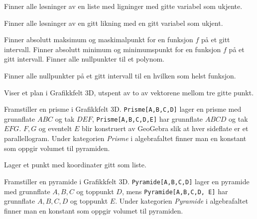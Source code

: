 

{Finner alle løsninger av en liste med ligninger med gitte variabel som ukjente.}

{Finner alle løsninger av en gitt likning med en gitt variabel som ukjent.}

 {Finner absolutt maksimum og maskimalpunkt for en funksjon $ f $ på et gitt intervall.}
\newpage
{} {Finner absolutt minimum og minimumspunkt for en funksjon $ f $ på et gitt intervall.}
\newpage
{}
{Finner alle nullpunkter til et polynom.}

{Finner alle nullpunkter på et gitt intervall til en hvilken som helst funksjon.}

{Viser et plan i Grafikkfelt 3D, utspent av to av vektorene mellom tre gitte punkt.}

{Framstiller en prisme i Grafikkfelt 3D. {\tt Prisme[A,B,C,D]} lager en prisme med grunnflate $ ABC $ og tak $ DEF $, {\tt Prisme[A,B,C,D,E]} har grunnflate $ ABCD $ og tak $ EFG $. $ F, G$ og eventelt $ E $ blir konstruert av GeoGebra slik at hver sideflate er et parallellogram. Under kategorien \textsl{Prisme} i algebrafaltet finner man en konstant som oppgir volumet til pyramiden.}

 {Lager et punkt med koordinater gitt som liste. \\
	
}

{Framstiller en pyramide i Grafikkfelt 3D. {\tt Pyramide[A,B,C,D]} lager en pyramide med grunnflate ${ A, B, C} $ og toppunkt $ D $, mens {\tt Pyramide[A,B,C,D, E]} har grunnflate ${ A, B, C, D }$ og toppunkt $ E $. Under kategorien \textsl{Pyramide} i algebrafaltet finner man en konstant som oppgir volumet til pyramiden.}

